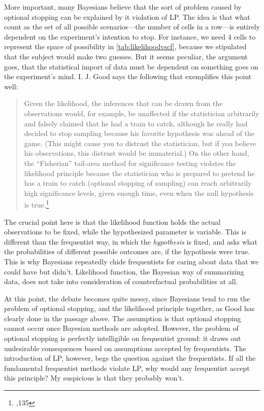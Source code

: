 More important, many Bayesians believe that the sort of problem caused by
optional stopping can be explained by it violation of LP. The idea is that what count as the set of all possible scenarios---the number of cells in a row---is entirely dependent on the experiment's intention to stop. For instance, we need 4 cells to represent the space of possibility in \ref{tab:likelihoodvscf}, because we stipulated that the subject would make two guesses. But it seems peculiar, the argument goes, that the statistical import of data must be dependent on something goes on the experiment's mind. I. J. Good says the following that exemplifies this point
well:

\begin{quote}
Given the likelihood, the inferences that can be drawn from the
observations would, for example, be unaffected if the statistician
arbitrarily and falsely claimed that he had a train to catch, although
he really had decided to stop sampling because his favorite hypothesis
was ahead of the game. (This might cause you to distrust the
statistician, but if you believe his observations, this distrust would
be immaterial.) On the other hand, the ``Fisherian'' tail-area method
for significance testing violates the likelihood principle because the
statistician who is prepared to pretend he has a train to catch
(optional stopping of sampling) can reach arbitrarily high significance
levels, given enough time, even when the null hypothesis is true.\footnote{\cite{goodthinking},135}
\end{quote}

The crucial point
here is that the likelihood function holds the actual observations to be
fixed, while the hypothesized parameter is variable. This is different
than the frequentist way, in which the \emph{hypothesis} is fixed, and
asks what the probabilities of different possible outcomes are, if the
hypothesis were true. This is why Bayesians repeatedly chide
frequentists for caring about data that we could have but didn't.
Likelihood function, the Bayesian way of summarizing data, does not take
into consideration of counterfactual probabilities at all.




At this point, the debate becomes quite messy, since Bayesians tend to
run the problem of optional stopping, and the likelihood principle
together, as Good has clearly done in the passage above. The assumption
is that optional stopping cannot occur once Bayesian methods are
adopted. However, the problem of optional stopping is perfectly
intelligible on frequentist ground: it draws out undesirable
consequences based on assumptions accepted by frequentists. The
introduction of LP, however, begs the question against the frequentists.
If all the fundamental frequentist methods violate LP, why would any
frequentist accept this principle? My suspicious is that they probably
won't.

